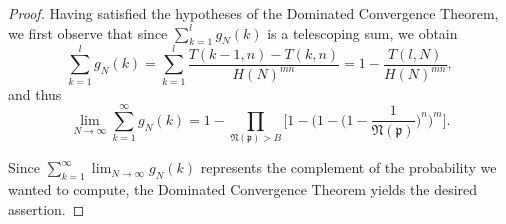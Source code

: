 \documentclass[10pt,a4paper]{article}
\theoremstyle{definition}
\theoremstyle{remark}
\begin{document}
\begin{proof}
Having satisfied the hypotheses of the Dominated Convergence Theorem, we first observe that since $\sum_{k=1}^l g_N(k)$ is a telescoping sum, we obtain
$$\sum_{k=1}^l g_N(k) = \sum_{k=1}^l \frac{T(k-1, n) - T(k, n)}{H(N)^{mn}} = 1 - \frac{T(l,N)}{H(N)^{mn}},$$ 
and thus
$$\lim_{N \to \infty} \sum_{k=1}^{\infty} g_N(k) = 1 - \prod_{\mathfrak{N}(\mathfrak{p}) > B} \Big[1 - \Big(1 - \Big(1 - \frac{1}{\mathfrak{N}(\mathfrak{p})}  \Big)^n\Big)^m\Big].$$

\noindent Since $\displaystyle \sum_{k=1}^{\infty} \lim_{N \to \infty} g_N(k)$ represents the complement of the probability we wanted to compute, the Dominated Convergence Theorem yields the desired assertion.
\end{proof}

\printbibliography
\end{document}
